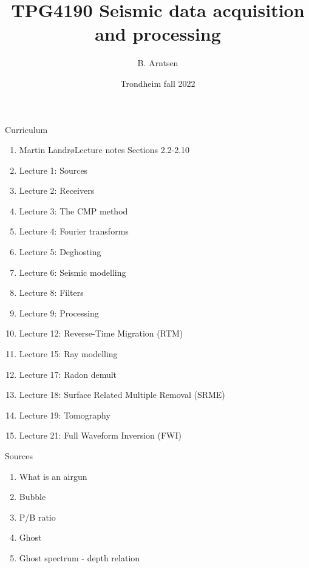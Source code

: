 \documentclass[xcolor=dvipsnames,notes]{beamer}
\begin{document}
\title{TPG4190 Seismic data acquisition and processing}
\author{B. Arntsen}
\date{Trondheim fall 2022}
\begin{frame}
 \titlepage
\end{frame}
\begin{frame}{Curriculum}
\begin{enumerate}
  \item Martin Landr\o Lecture notes Sections 2.2-2.10
  \item Lecture 1: Sources 
  \item Lecture 2: Receivers
  \item Lecture 3: The CMP method
  \item Lecture 4: Fourier transforms
  \item Lecture 5: Deghosting
  \item Lecture 6: Seismic modelling 
  \item Lecture 8: Filters
  \item Lecture 9: Processing
  \item Lecture 12: Reverse-Time Migration (RTM)
  \item Lecture 15: Ray modelling
  \item Lecture 17: Radon demult
  \item Lecture 18: Surface Related Multiple Removal (SRME)
  \item Lecture 19: Tomography
  \item Lecture 21: Full Waveform Inversion (FWI)
\end{enumerate}
\end{frame}
\begin{frame}{Sources}
\begin{enumerate}
  \item What is an airgun
  \item Bubble
  \item P/B ratio
  \item Ghost
  \item Ghost spectrum - depth relation
\end{enumerate}
\end{frame}
\end{document}

